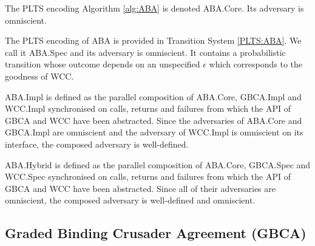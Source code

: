 \begin{definition}
    \label{ABA:Core}

    The PLTS encoding Algorithm \ref{alg:ABA} is denoted \textsf{ABA.Core}.
    Its adversary is omniscient.
\end{definition}

\begin{specification}
    \label{ABA:Spec}

    The PLTS encoding of \textsf{ABA} is provided in Transition System \ref{PLTS:ABA}.
    We call it \textsf{ABA.Spec} and its adversary is omniscient.
    It contains a probabilistic transition whose outcome depends on an unspecified
    $\epsilon$ which corresponds to the goodness of \textsf{WCC}.
\end{specification}

\begin{definition}
    \label{ABA:Impl}

    \textsf{ABA.Impl} is defined as the parallel composition of
    \textsf{ABA.Core}, \textsf{GBCA.Impl} and \textsf{WCC.Impl}
    synchronised on calls, returns and failures from which the
    API of \textsf{GBCA} and \textsf{WCC} have been abstracted.
    Since the adversaries of \textsf{ABA.Core} and \textsf{GBCA.Impl}
    are omniscient and the adversary of \textsf{WCC.Impl} is omniscient
    on its interface, the composed adversary is well-defined.
\end{definition}

\begin{definition}
    \label{ABA:Hybrid}

    \textsf{ABA.Hybrid} is defined as the parallel composition of
    \textsf{ABA.Core}, \textsf{GBCA.Spec} and \textsf{WCC.Spec}
    synchronised on calls, returns and failures from which the
    API of \textsf{GBCA} and \textsf{WCC} have been abstracted. Since all of their adversaries
    are omniscient, the composed adversary is well-defined and omniscient.
\end{definition}

\subsection{Graded Binding Crusader Agreement (\textsf{GBCA})}

